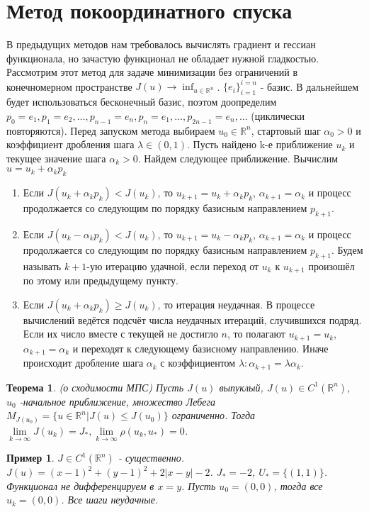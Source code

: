 \documentclass[9pt, a4paper]{extarticle}
\newtheorem*{theorem}{Теорема}
\newtheorem*{sample}{Пример}
\begin{document}
\section{Метод покоординатного спуска}
	В предыдущих методов нам требовалось вычислять градиент и гессиан функционала, но зачастую функционал не обладает нужной гладкостью. Рассмотрим этот метод для задаче минимизации без ограничений в конечномерном пространстве $J(u) \to \inf_{u\in \mathbb{R}^n}$. $\{e_i\}_{i=1}^{i=n}$ - базис. В дальнейшем будет использоваться бесконечный базис, поэтом доопределим $p_0 = e_1, p_1 = e_2, \dots, p_{n-1} = e_n, p_n = e_1, \dots, p_{2n-1}= e_n, \dots$ (циклически повторяются). \newline
	Перед запуском метода выбираем $u_0 \in \mathbb{R}^n$, стартовый шаг $\alpha_0 > 0$ и коэффициент дробления шага $\lambda \in (0,1)$. Пусть найдено k-е приближение $u_k$ и текущее значение шага $\alpha_k > 0$. Найдем следующее приближение. Вычислим $u = u_k + \alpha_k p_k$
	\begin{enumerate}
		\item Если $J(u_k + \alpha_k p_k) < J(u_k)$, то $u_{k+1} = u_k + \alpha_k p_k$, $\alpha_{k+1} = \alpha_k$ и процесс продолжается со следующим по порядку базисным направлением $p_{k+1}$. 
			\item Если $J(u_k - \alpha_k p_k) < J(u_k)$, то $u_{k+1} = u_k - \alpha_k p_k$, $\alpha_{k+1} = \alpha_k$ и процесс продолжается со следующим по порядку базисным направлением $p_{k+1}$. Будем называть $k+1$-ую итерацию удачной, если переход от $u_k$ к $u_{k+1}$ произошёл по этому или предыдущему пункту.
		\item Если $J(u_k + \alpha_k p_k) \geq J(u_k)$, то итерация неудачная. В процессе вычислений ведётся подсчёт числа неудачных итераций, случившихся подряд. Если их число вместе с текущей не достигло $n$, то полагают $u_{k+1} = u_k$, $\alpha_{k+1} = \alpha_k$ и переходят к следующему базисному направлению. Иначе происходит дробление шага $\alpha_k$ с коэффициентом $\lambda: \alpha_{k+1} = \lambda \alpha_k$.
	\end{enumerate}
	\begin{theorem}
		(о сходимости МПС)  \newline
		Пусть $J(u)$ выпуклый, $J(u) \in C^1(\mathbb{R}^n)$, $u_0$ -начальное приближение,  множество Лебега $M_{J(u_0)} = \{u \in \mathbb{R}^n \vert J(u) \leq J(u_0)\}$ ограниченно. Тогда $\lim\limits_{k\to\infty} J(u_k) = J_*, \lim\limits_{k\to\infty} \rho(u_k, u_*) = 0$.		
	\end{theorem}
	\begin{sample}
		$J\in C^1(\mathbb{R}^n)$ - существенно. $J(u) = (x-1)^2 + (y-1)^2 + 2 |x-y| -2$. $J_* = -2$, $U_* = \{(1,1)\}$. Функционал не дифференцируем в $x=y$. Пусть $u_0 = (0,0)$, тогда все $u_k = (0,0)$. Все шаги неудачные. 
	\end{sample}
\end{document}
